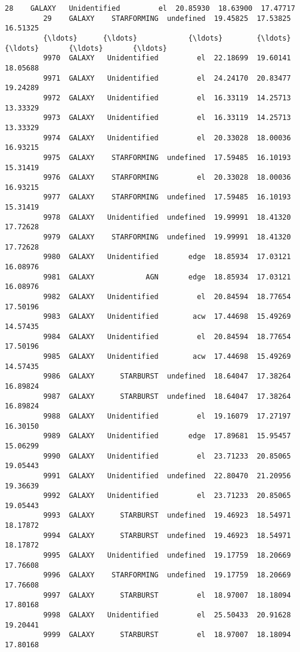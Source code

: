 \documentclass[11pt]{article}
\begin{document}
\begin{Verbatim}[commandchars=\\\{\}]
         28    GALAXY   Unidentified         el  20.85930  18.63900  17.47717   
         29    GALAXY    STARFORMING  undefined  19.45825  17.53825  16.51325   
         {\ldots}      {\ldots}            {\ldots}        {\ldots}       {\ldots}       {\ldots}       {\ldots}   
         9970  GALAXY   Unidentified         el  22.18699  19.60141  18.05688   
         9971  GALAXY   Unidentified         el  24.24170  20.83477  19.24289   
         9972  GALAXY   Unidentified         el  16.33119  14.25713  13.33329   
         9973  GALAXY   Unidentified         el  16.33119  14.25713  13.33329   
         9974  GALAXY   Unidentified         el  20.33028  18.00036  16.93215   
         9975  GALAXY    STARFORMING  undefined  17.59485  16.10193  15.31419   
         9976  GALAXY    STARFORMING         el  20.33028  18.00036  16.93215   
         9977  GALAXY    STARFORMING  undefined  17.59485  16.10193  15.31419   
         9978  GALAXY   Unidentified  undefined  19.99991  18.41320  17.72628   
         9979  GALAXY    STARFORMING  undefined  19.99991  18.41320  17.72628   
         9980  GALAXY   Unidentified       edge  18.85934  17.03121  16.08976   
         9981  GALAXY            AGN       edge  18.85934  17.03121  16.08976   
         9982  GALAXY   Unidentified         el  20.84594  18.77654  17.50196   
         9983  GALAXY   Unidentified        acw  17.44698  15.49269  14.57435   
         9984  GALAXY   Unidentified         el  20.84594  18.77654  17.50196   
         9985  GALAXY   Unidentified        acw  17.44698  15.49269  14.57435   
         9986  GALAXY      STARBURST  undefined  18.64047  17.38264  16.89824   
         9987  GALAXY      STARBURST  undefined  18.64047  17.38264  16.89824   
         9988  GALAXY   Unidentified         el  19.16079  17.27197  16.30150   
         9989  GALAXY   Unidentified       edge  17.89681  15.95457  15.06299   
         9990  GALAXY   Unidentified         el  23.71233  20.85065  19.05443   
         9991  GALAXY   Unidentified  undefined  22.80470  21.20956  19.36639   
         9992  GALAXY   Unidentified         el  23.71233  20.85065  19.05443   
         9993  GALAXY      STARBURST  undefined  19.46923  18.54971  18.17872   
         9994  GALAXY      STARBURST  undefined  19.46923  18.54971  18.17872   
         9995  GALAXY   Unidentified  undefined  19.17759  18.20669  17.76608   
         9996  GALAXY    STARFORMING  undefined  19.17759  18.20669  17.76608   
         9997  GALAXY      STARBURST         el  18.97007  18.18094  17.80168   
         9998  GALAXY   Unidentified         el  25.50433  20.91628  19.20441   
         9999  GALAXY      STARBURST         el  18.97007  18.18094  17.80168   
         

\end{Verbatim}
\end{document}
